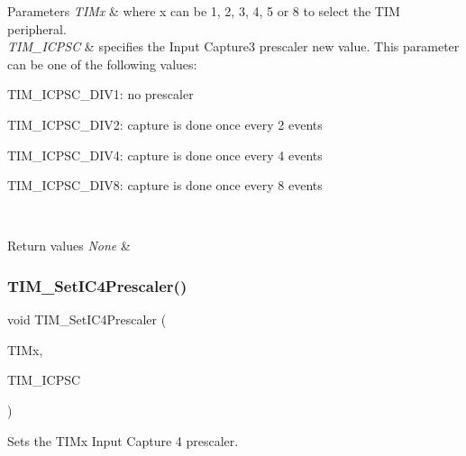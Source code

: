 \begin{DoxyParams}{Parameters}
{\em T\+I\+Mx} & where x can be 1, 2, 3, 4, 5 or 8 to select the T\+IM peripheral. \\
\hline
{\em T\+I\+M\+\_\+\+I\+C\+P\+SC} & specifies the Input Capture3 prescaler new value. This parameter can be one of the following values\+: \begin{DoxyItemize}
\item T\+I\+M\+\_\+\+I\+C\+P\+S\+C\+\_\+\+D\+I\+V1\+: no prescaler \item T\+I\+M\+\_\+\+I\+C\+P\+S\+C\+\_\+\+D\+I\+V2\+: capture is done once every 2 events \item T\+I\+M\+\_\+\+I\+C\+P\+S\+C\+\_\+\+D\+I\+V4\+: capture is done once every 4 events \item T\+I\+M\+\_\+\+I\+C\+P\+S\+C\+\_\+\+D\+I\+V8\+: capture is done once every 8 events \end{DoxyItemize}
\\
\hline
\end{DoxyParams}

\begin{DoxyRetVals}{Return values}
{\em None} & \\
\hline
\end{DoxyRetVals}
\mbox{\label{group___t_i_m___exported___functions_ga0f2c784271356d6b64b8c0da64dbdbc2}} 
\subsubsection{\texorpdfstring{TIM\_SetIC4Prescaler()}{TIM\_SetIC4Prescaler()}}
{\footnotesize\ttfamily void T\+I\+M\+\_\+\+Set\+I\+C4\+Prescaler (\begin{DoxyParamCaption}\item[{\mbox{\hyperlink{struct_t_i_m___type_def}{T\+I\+M\+\_\+\+Type\+Def}} $\ast$}]{T\+I\+Mx,  }\item[{uint16\+\_\+t}]{T\+I\+M\+\_\+\+I\+C\+P\+SC }\end{DoxyParamCaption})}



Sets the T\+I\+Mx Input Capture 4 prescaler. 


